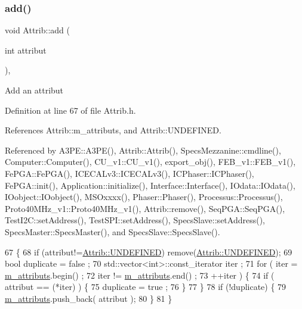 \subsubsection{\texorpdfstring{add()}{add()}}
{\footnotesize\ttfamily void Attrib\+::add (\begin{DoxyParamCaption}\item[{int}]{attribut }\end{DoxyParamCaption})\hspace{0.3cm}{\ttfamily [inline]}, {\ttfamily [inherited]}}

Add an attribut 

Definition at line 67 of file Attrib.\+h.



References Attrib\+::m\+\_\+attributs, and Attrib\+::\+U\+N\+D\+E\+F\+I\+N\+ED.



Referenced by A3\+P\+E\+::\+A3\+P\+E(), Attrib\+::\+Attrib(), Specs\+Mezzanine\+::cmdline(), Computer\+::\+Computer(), C\+U\+\_\+v1\+::\+C\+U\+\_\+v1(), export\+\_\+obj(), F\+E\+B\+\_\+v1\+::\+F\+E\+B\+\_\+v1(), Fe\+P\+G\+A\+::\+Fe\+P\+G\+A(), I\+C\+E\+C\+A\+Lv3\+::\+I\+C\+E\+C\+A\+Lv3(), I\+C\+Phaser\+::\+I\+C\+Phaser(), Fe\+P\+G\+A\+::init(), Application\+::initialize(), Interface\+::\+Interface(), I\+Odata\+::\+I\+Odata(), I\+Oobject\+::\+I\+Oobject(), M\+S\+Oxxxx(), Phaser\+::\+Phaser(), Processus\+::\+Processus(), Proto40\+M\+Hz\+\_\+v1\+::\+Proto40\+M\+Hz\+\_\+v1(), Attrib\+::remove(), Seq\+P\+G\+A\+::\+Seq\+P\+G\+A(), Test\+I2\+C\+::set\+Address(), Test\+S\+P\+I\+::set\+Address(), Specs\+Slave\+::set\+Address(), Specs\+Master\+::\+Specs\+Master(), and Specs\+Slave\+::\+Specs\+Slave().


\begin{DoxyCode}
67                             \{
68     \textcolor{keywordflow}{if} (attribut!=\hyperlink{classAttrib_a69e171d7cc6417835a5a306d3c764235a3a8da2ab97dda18aebab196fe4100531}{Attrib::UNDEFINED}) \textcolor{keyword}{remove}(\hyperlink{classAttrib_a69e171d7cc6417835a5a306d3c764235a3a8da2ab97dda18aebab196fe4100531}{Attrib::UNDEFINED});
69     \textcolor{keywordtype}{bool} duplicate = false ;
70     std::vector<int>::const\_iterator iter ;
71     \textcolor{keywordflow}{for} ( iter  = \hyperlink{classAttrib_ac4bd58a0cc6b38a3b711d609a3d3aacc}{m\_attributs}.begin() ;
72           iter != \hyperlink{classAttrib_ac4bd58a0cc6b38a3b711d609a3d3aacc}{m\_attributs}.end()   ;
73           ++iter ) \{
74       \textcolor{keywordflow}{if} ( attribut == (*iter) ) \{
75         duplicate = true ;
76       \}
77     \}
78     \textcolor{keywordflow}{if} (!duplicate) \{
79       \hyperlink{classAttrib_ac4bd58a0cc6b38a3b711d609a3d3aacc}{m\_attributs}.push\_back( attribut );
80     \}
81   \}
\end{DoxyCode}
\mbox{\label{classHierarchy_ad677774ff38fcb257c04a3a10d471fac}} 
